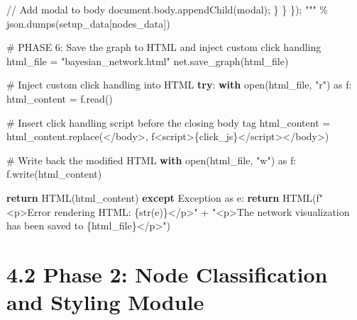 \documentclass[
  11pt,
  letterpaper,
]{book}
\newenvironment{Shaded}{\begin{snugshade}}{\end{snugshade}}
\newcommand{\BuiltInTok}[1]{\textcolor[rgb]{0.00,0.23,0.31}{#1}}
\newcommand{\CommentTok}[1]{\textcolor[rgb]{0.37,0.37,0.37}{#1}}
\newcommand{\ControlFlowTok}[1]{\textcolor[rgb]{0.00,0.23,0.31}{\textbf{#1}}}
\newcommand{\ImportTok}[1]{\textcolor[rgb]{0.00,0.46,0.62}{#1}}
\newcommand{\NormalTok}[1]{\textcolor[rgb]{0.00,0.23,0.31}{#1}}
\newcommand{\OperatorTok}[1]{\textcolor[rgb]{0.37,0.37,0.37}{#1}}
\newcommand{\PreprocessorTok}[1]{\textcolor[rgb]{0.68,0.00,0.00}{#1}}
\newcommand{\SpecialCharTok}[1]{\textcolor[rgb]{0.37,0.37,0.37}{#1}}
\newcommand{\SpecialStringTok}[1]{\textcolor[rgb]{0.13,0.47,0.30}{#1}}
\newcommand{\StringTok}[1]{\textcolor[rgb]{0.13,0.47,0.30}{#1}}
\begin{document}
\begin{Shaded}
\begin{Highlighting}[]
\StringTok{                // Add modal to body}
\StringTok{                document.body.appendChild(modal);}
\StringTok{            \}}
\StringTok{        \}}
\StringTok{    \});}
\StringTok{    """} \OperatorTok{\%}\NormalTok{ json.dumps(setup\_data[}\StringTok{\textquotesingle{}nodes\_data\textquotesingle{}}\NormalTok{])}

    \CommentTok{\# PHASE 6: Save the graph to HTML and inject custom click handling}
\NormalTok{    html\_file }\OperatorTok{=} \StringTok{"bayesian\_network.html"}
\NormalTok{    net.save\_graph(html\_file)}

    \CommentTok{\# Inject custom click handling into HTML}
    \ControlFlowTok{try}\NormalTok{:}
        \ControlFlowTok{with} \BuiltInTok{open}\NormalTok{(html\_file, }\StringTok{"r"}\NormalTok{) }\ImportTok{as}\NormalTok{ f:}
\NormalTok{            html\_content }\OperatorTok{=}\NormalTok{ f.read()}

        \CommentTok{\# Insert click handling script before the closing body tag}
\NormalTok{        html\_content }\OperatorTok{=}\NormalTok{ html\_content.replace(}\StringTok{\textquotesingle{}\textless{}/body\textgreater{}\textquotesingle{}}\NormalTok{, }\SpecialStringTok{f\textquotesingle{}\textless{}script\textgreater{}}\SpecialCharTok{\{}\NormalTok{click\_js}\SpecialCharTok{\}}\SpecialStringTok{\textless{}/script\textgreater{}\textless{}/body\textgreater{}\textquotesingle{}}\NormalTok{)}

        \CommentTok{\# Write back the modified HTML}
        \ControlFlowTok{with} \BuiltInTok{open}\NormalTok{(html\_file, }\StringTok{"w"}\NormalTok{) }\ImportTok{as}\NormalTok{ f:}
\NormalTok{            f.write(html\_content)}

        \ControlFlowTok{return}\NormalTok{ HTML(html\_content)}
    \ControlFlowTok{except} \PreprocessorTok{Exception} \ImportTok{as}\NormalTok{ e:}
        \ControlFlowTok{return}\NormalTok{ HTML(}\SpecialStringTok{f"\textless{}p\textgreater{}Error rendering HTML: }\SpecialCharTok{\{}\BuiltInTok{str}\NormalTok{(e)}\SpecialCharTok{\}}\SpecialStringTok{\textless{}/p\textgreater{}"}
          \OperatorTok{+} \StringTok{"\textless{}p\textgreater{}The network visualization has been saved to \textquotesingle{}}\SpecialCharTok{\{html\_file\}}\StringTok{\textquotesingle{}\textless{}/p\textgreater{}"}\NormalTok{)}
\end{Highlighting}
\end{Shaded}

\section{4.2 Phase 2: Node Classification and Styling
Module}\label{phase-2-node-classification-and-styling-module}
\end{document}
